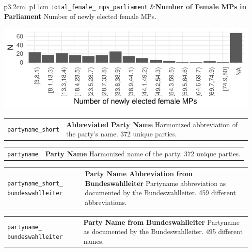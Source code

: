 \documentclass[
]{article}
\begin{document}
\begin{longtable}{p{3.2cm}| p{11cm}}
\texttt{total\_female\_
mps\_parliament} &\textbf{Number of Female MPs in Parliament}\newline 
Number of newly elected female MPs.

\hspace*{.25cm}
\begin{minipage}[t]{\linewidth }
\vspace{0pt}
\includegraphics[width = \linewidth]{cbelec/totfemmpsplot.pdf}
\end{minipage}


\end{longtable}

\begin{longtable}{p{3.2cm}| p{11cm}}
\texttt{partyname\_short} &\textbf{Abbreviated Party Name}\newline 
Harmonized abbreviation of the party's name. 372 unique parties.
\end{longtable}

\begin{longtable}{p{3.2cm}| p{11cm}}
\texttt{partyname} &\textbf{Party Name}\newline 
Harmonized name of the party. 372 unique parties.
\end{longtable}

\begin{longtable}{p{3.2cm}| p{11cm}}
\texttt{partyname\_short\_
bundeswahlleiter} &\textbf{Party Name Abbreviation from Bundeswahlleiter}\newline 
Partyname abbreviation as documented by the Bundeswahlleiter. 459 different abbreviations.
\end{longtable}

\begin{longtable}{p{3.2cm}| p{11cm}}
\texttt{partyname\_
bundeswahlleiter} &\textbf{Party Name from Bundeswahlleiter}\newline 
Partyname as documented by the Bundeswahlleiter. 495 different names.
\end{longtable}
\end{document}
